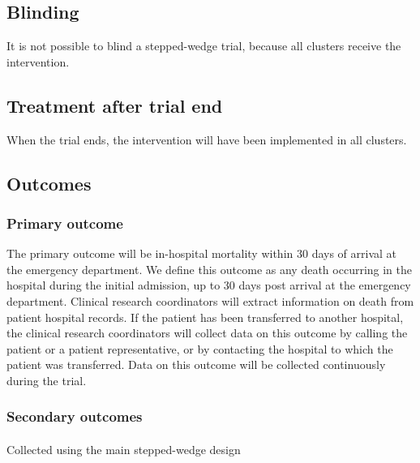 \documentclass[
]{scrartcl}
\makeatletter
\let\oldparagraph\paragraph
\renewcommand{\paragraph}{
    \@ifstar
      \xxxParagraphStar
      \xxxParagraphNoStar
  }
\newcommand{\xxxParagraphStar}[1]{\oldparagraph*{#1}\mbox{}}
\newcommand{\xxxParagraphNoStar}[1]{\oldparagraph{#1}\mbox{}}
\makeatother
\begin{document}
\subsection{Blinding}\label{blinding}

It is not possible to blind a stepped-wedge trial, because all clusters
receive the intervention.

\subsection{Treatment after trial end}\label{treatment-after-trial-end}

When the trial ends, the intervention will have been implemented in all
clusters.

\subsection{Outcomes}\label{outcomes}

\subsubsection{Primary outcome}\label{primary-outcome}

The primary outcome will be in-hospital mortality within 30 days of
arrival at the emergency department. We define this outcome as any death
occurring in the hospital during the initial admission, up to 30 days
post arrival at the emergency department. Clinical research coordinators
will extract information on death from patient hospital records. If the
patient has been transferred to another hospital, the clinical research
coordinators will collect data on this outcome by calling the patient or
a patient representative, or by contacting the hospital to which the
patient was transferred. Data on this outcome will be collected
continuously during the trial.

\subsubsection{Secondary outcomes}\label{secondary-outcomes}

\paragraph{Collected using the main stepped-wedge
design}\label{collected-using-the-main-stepped-wedge-design}
\end{document}
